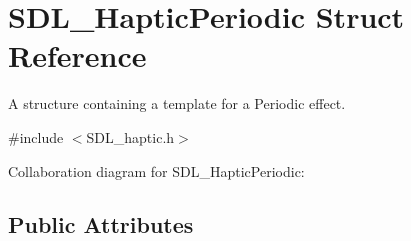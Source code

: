 \hypertarget{struct_s_d_l___haptic_periodic}{\section{S\-D\-L\-\_\-\-Haptic\-Periodic Struct Reference}
\label{struct_s_d_l___haptic_periodic}
}


A structure containing a template for a Periodic effect.  




{\ttfamily \#include $<$S\-D\-L\-\_\-haptic.\-h$>$}



Collaboration diagram for S\-D\-L\-\_\-\-Haptic\-Periodic\-:
\subsection*{Public Attributes}
